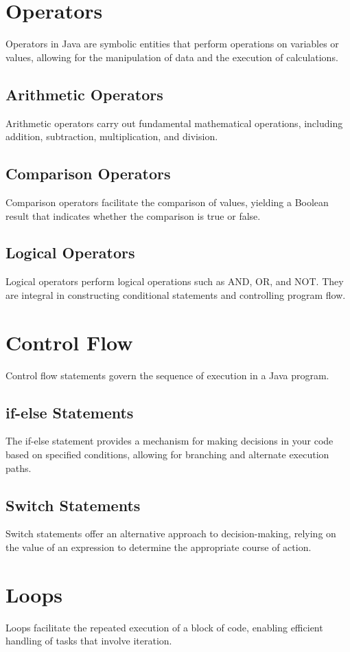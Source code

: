 \documentclass{article}
\begin{document}
\section{Operators}
Operators in Java are symbolic entities that perform operations on variables or values, allowing for the manipulation of data and the execution of calculations.

\subsection{Arithmetic Operators}
Arithmetic operators carry out fundamental mathematical operations, including addition, subtraction, multiplication, and division.

\subsection{Comparison Operators}
Comparison operators facilitate the comparison of values, yielding a Boolean result that indicates whether the comparison is true or false.

\subsection{Logical Operators}
Logical operators perform logical operations such as AND, OR, and NOT. They are integral in constructing conditional statements and controlling program flow.

\section{Control Flow}
Control flow statements govern the sequence of execution in a Java program.

\subsection{if-else Statements}
The if-else statement provides a mechanism for making decisions in your code based on specified conditions, allowing for branching and alternate execution paths.

\subsection{Switch Statements}
Switch statements offer an alternative approach to decision-making, relying on the value of an expression to determine the appropriate course of action.

\section{Loops}
Loops facilitate the repeated execution of a block of code, enabling efficient handling of tasks that involve iteration.
\end{document}
